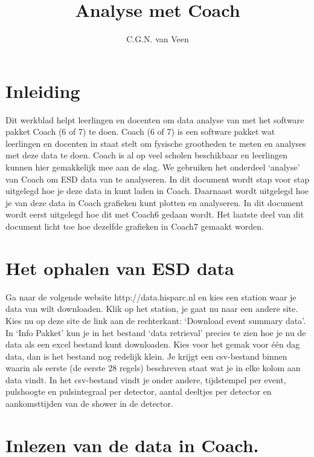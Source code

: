 

\title{Analyse met Coach}
\author{C.G.N. van Veen}



\maketitle

\section{Inleiding}

Dit werkblad helpt leerlingen en docenten om data analyse van \hisparc met 
het software pakket Coach (6 of 7) te doen. Coach (6 of 7) is een software pakket wat leerlingen
en docenten in staat stelt om fysische grootheden te meten en analyses met deze 
data te doen. Coach is al op veel scholen beschikbaar en leerlingen kunnen hier
gemakkelijk mee aan de slag.
We gebruiken het onderdeel `analyse' van Coach om ESD data van \hisparc te analyseren.
In dit document wordt stap voor stap uitgelegd hoe je deze data in kunt laden in 
Coach. Daarnaast wordt uitgelegd hoe je van deze data in Coach
grafieken kunt plotten en analyseren. In dit document wordt eerst uitgelegd hoe
dit met Coach6 gedaan wordt. Het laatste deel van dit document licht toe hoe dezelfde grafieken
in Coach7 gemaakt worden.

\section{Het ophalen van ESD data}

Ga naar de volgende website http://data.hisparc.nl en kies een station waar 
je data van wilt downloaden. Klik op het station, je gaat nu naar een andere site.
Kies nu op deze site de link aan de rechterkant: `Download event summary data'.
In `Info Pakket' kun je in het bestand `data retrieval' precies te zien hoe je 
nu de data als een excel bestand kunt downloaden.
Kies voor het gemak voor één dag data, dan is het bestand nog redelijk klein.
Je krijgt een csv-bestand binnen waarin als eerste (de eerste 28 regels) beschreven staat wat je 
in elke kolom aan data vindt. In het csv-bestand vindt je onder andere, tijdstempel per event,
pulshoogte en pulsintegraal per detector, aantal deeltjes per detector en aankomsttijden van
de shower in de detector.

\section{Inlezen van de data in Coach.}

